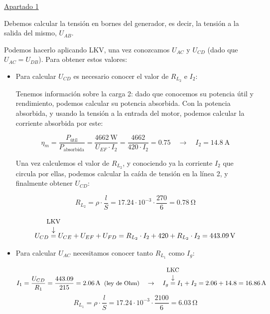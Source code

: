\begin{example}
    
    \vspace{3mm}
    
    \underline{Apartado 1}
    
    \vspace{4mm}
    
    Debemos calcular la tensión en bornes del generador, es decir, la
    tensión a la salida del mismo, $U_{AB}$.
    
    Podemos hacerlo aplicando LKV, una vez conozcamos $U_{AC}$ y
    $U_{CD}$ (dado que $U_{AC} = U_{DB}$). Para obtener estos valores:
    \begin{itemize}
    \item Para calcular $U_{CD}$ es necesario conocer el valor de
      $R_{L_2}$ e $I_2$:
    
      Tenemos información sobre la carga 2: dado que conocemos su
      potencia útil y rendimiento, podemos calcular su potencia
      absorbida. Con la potencia absorbida, y usando la tensión a la
      entrada del motor, podemos calcular la corriente absorbida por
      este:
        
        \[
          \eta_m = \frac{P_{\textrm{útil}}}{P_{\textrm{absorbida}}} =
          \frac{\qty{4662}{\watt}}{U_{EF} \cdot I_2} =
          \frac{4662}{420\cdot I_2} = 0.75 \quad \rightarrow \quad I_2
          = \qty{14.8}{\ampere}
        \]
    
        Una vez calculemos el valor de $R_{L_2}$, y conociendo ya la
        corriente $I_2$ que circula por ellas, podemos calcular la
        caída de tensión en la línea 2, y finalmente obtener $U_{CD}$:
    
        \[
          R_{L_2} = \rho \cdot \frac{l}{S} = {17.24 \cdot 10^{-3}}
          \cdot \frac{270}{6} = \qty{0.78}{\ohm}
        \]
        
        \vspace{-10mm}
        \[
          U_{CD} \overarrow[=][\downarrow]{\small LKV} U_{CE} + U_{EF}
          + U_{FD} = R_{L_2}\cdot I_2 + 420 + R_{L_2}\cdot I_2 =
          \qty{443.09}{\volt}
        \]
    
      \item Para calcular $U_{AC}$ necesitamos conocer tanto $R_{L_1}$
        como $I_g$:
    
        \vspace{-7mm}
        \[
          I_1 = \frac{U_{CD}}{R_1} = \frac{443.09}{215} =
          \qty{2.06}{\ampere} \;\; \text{\small (ley de Ohm)} \quad
          \rightarrow \quad I_g \overarrow[=][\downarrow]{\small LKC}
          I_1 + I_2 = 2.06 + 14.8 = \qty{16.86}{\ampere}
        \]
        \[
          R_{L_1} = \rho \cdot \frac{l}{S} = {17.24 \cdot 10^{-3}}
          \cdot \frac{2100}{6} = \qty{6.03}{\ohm}
        \]
    

\end{itemize}
\end{example}
